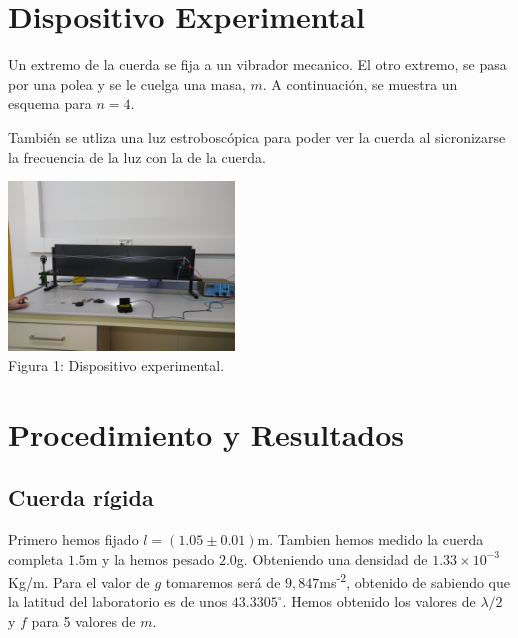 \documentclass{article}
\begin{document}
\begin{multicols}{2}
\section*{Dispositivo Experimental}
Un extremo de la cuerda se fija a un vibrador mecanico. El otro extremo, se pasa por una polea y se le cuelga una masa, $m$. A continuación, se muestra un esquema para $n = 4$.
\begin{center}
\end{center}
También se utliza una luz estroboscópica para poder ver  la cuerda al sicronizarse la frecuencia de la luz con la de la cuerda.
\begin{center}
  \includegraphics[width=0.45\textwidth]{figures/montaje.png}\\
  Figura 1: Dispositivo experimental.
\end{center}

\section*{Procedimiento y Resultados}
\subsection*{Cuerda rígida}
Primero hemos fijado $l=(1.05 \pm 0.01)$m. Tambien hemos medido la cuerda completa $1.5$m y la hemos pesado $2.0$g. Obteniendo una densidad de $1.33\times10^{-3}$Kg/m. Para el valor de $g$ tomaremos será de $9,847$ms\textsuperscript{-2}, obtenido de \cite{gravedad} sabiendo que la latitud del laboratorio es de unos $43.3305^\circ$. Hemos obtenido los valores de $\lambda/2$ y $f$ para 5 valores de $m$.
\end{multicols}
\end{document}
